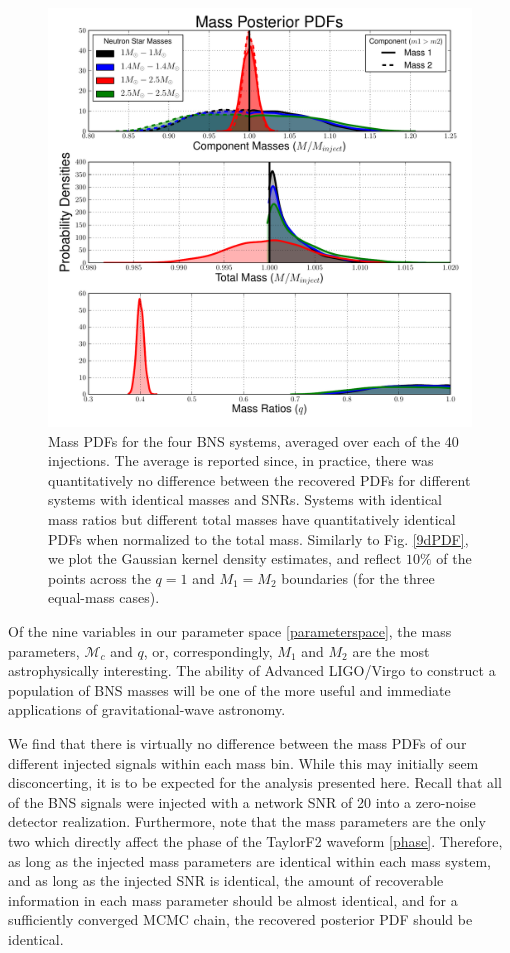 \documentclass[11pt,a4paper]{emulateapj} 
\newcommand{\chmass}{\mathcal{M}_c}
\begin{document}
\begin{figure}[ht!]
  \centering \includegraphics[trim=3cm 0cm 2cm 0cm,
    clip=false,scale=0.75]{newMasses.pdf}
 \caption{Mass PDFs for the four BNS systems, averaged over each of
   the 40 injections.  The average is reported since, in practice,
   there was quantitatively no difference between the recovered PDFs
   for different systems with identical masses and SNRs.  Systems with
   identical mass ratios but different total masses have
   quantitatively identical PDFs when normalized to the total
   mass.  Similarly to Fig. \ref{9dPDF}, we plot the Gaussian kernel density
   estimates, and reflect $10\%$ of the points across the $q = 1$ and $M_1 = M_2$ boundaries (for the three equal-mass cases).}
  \label{metaMassPDFs}
\end{figure}

Of the nine variables in our parameter space \eqref{parameterspace},
the mass parameters, $\chmass$ and $q$, or, correspondingly, $M_1$ and
$M_2$ are the most astrophysically interesting.  The ability of
Advanced LIGO/Virgo to construct a population of BNS masses will be
one of the more useful and immediate applications of gravitational-wave astronomy.

We find that there is virtually no difference between the mass PDFs of
our different injected signals within each mass bin.  While this may
initially seem disconcerting, it is to be expected for the analysis presented here.
  Recall that all
of the BNS signals were injected with a network SNR of 20 into a
zero-noise detector realization.  Furthermore, note that the mass
parameters are the only two which directly affect the phase of the
TaylorF2 waveform \eqref{phase}.  Therefore, as long as the injected
mass parameters are identical within each mass system, and as long as
the injected SNR is identical, the amount of recoverable information
in each mass parameter should be almost identical, and for a
sufficiently converged MCMC chain, the recovered posterior PDF should
be identical.
\end{document}
